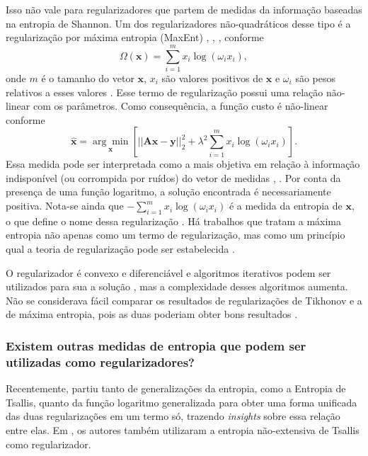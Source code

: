 Isso não vale para regularizadores que partem de medidas da informação baseadas na entropia de Shannon. Um dos regularizadores não-quadráticos desse tipo é a regularização por máxima entropia (MaxEnt) \cite{Smith1985, Amato1991}, \cite[pág. 192]{bovik2005handbook}, \cite{Silva2016}, conforme 
\begin{equation}
\Omega(\mathbf{x}) = \sum_{i=1}^{m} x_i \log(\omega_i x_i), 
\label{eq:shannon}
\end{equation}
onde $m$ é o tamanho do vetor $\mathbf{x}$, $x_i$ são valores positivos de $\mathbf{x}$ e $\omega_i$ são pesos relativos a esses valores \cite{Hansen2007}. Esse termo de regularização possui uma relação não-linear com os parâmetros. Como consequência, a função custo  é não-linear conforme 
\begin{equation}
\hat{\mathbf{x}} = \underset{\mathbf{x}}{\arg\min} \left[ \vert \vert \mathbf{A}\mathbf{x} - \mathbf{y} \vert \vert^2_2 + \lambda^2 \sum_{i=1}^{m} x_i \log(\omega_i x_i) \right].
\label{eq:shannon2}
\end{equation}
Essa medida pode ser interpretada como a mais objetiva em relação à informação indisponível (ou corrompida por ruídos) do vetor de medidas \cite{Hansen2007}, \cite[pág. 192]{bovik2005handbook}. Por conta da presença de uma função logaritmo, a solução encontrada é necessariamente positiva. Nota-se ainda que $-\sum_{i=1}^{m} x_i \log(\omega_i x_i)$ é a medida da entropia de $\mathbf{x}$, o que define o nome dessa regularização \cite[pág. 28]{Hansen2007}. Há trabalhos que tratam a máxima entropia não apenas como um termo de regularização, mas como um princípio qual a teoria de regularização pode ser estabelecida \cite[págs. 2793-4]{Chen2002}. 

O regularizador é convexo e diferenciável e algoritmos iterativos podem ser utilizados para sua a solução \cite[pág. 138]{engl1996regularization}, mas a complexidade desses algoritmos aumenta. Não se considerava fácil comparar os resultados de regularizações de Tikhonov e a de máxima entropia, pois as duas poderiam obter bons resultados \cite[pág. 140]{engl1996regularization}. 




\subsubsection{Existem outras medidas de entropia que podem ser utilizadas como regularizadores?}

Recentemente, \cite{Menin} partiu tanto de generalizações da entropia, como a Entropia de Tsallis, quanto da função logaritmo generalizada para obter uma forma unificada das duas regularizações em um termo só, trazendo \textit{insights} sobre essa relação entre elas. Em \cite{Velho2006}, os autores também utilizaram a entropia não-extensiva de Tsallis como regularizador. 

